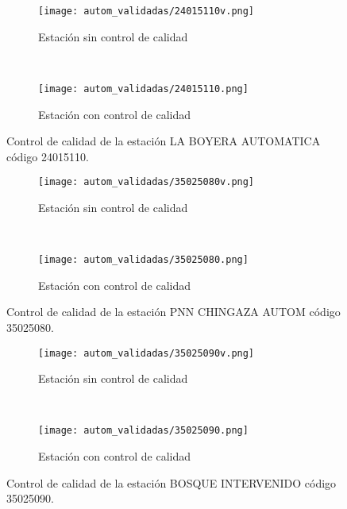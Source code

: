 \begin{figure}[H]
\begin{subfigure}[b]{0.5\textwidth}
\begin{center}
\texttt{[image: autom\_validadas/24015110v.png]}
\caption{Estación sin control de calidad}
        \end{center}
\end{subfigure}
~
\begin{subfigure}[b]{0.5\textwidth}
\begin{center}
\texttt{[image: autom\_validadas/24015110.png]}
\caption{Estación con control de calidad}
\end{center}    
\end{subfigure}
\caption{Control de calidad de la estación LA BOYERA AUTOMATICA código 24015110.}
\end{figure}    
  
\begin{figure}[H]
\begin{subfigure}[b]{0.5\textwidth}
\begin{center}
\texttt{[image: autom\_validadas/35025080v.png]}
\caption{Estación sin control de calidad}
        \end{center}
\end{subfigure}
~
\begin{subfigure}[b]{0.5\textwidth}
\begin{center}
\texttt{[image: autom\_validadas/35025080.png]}
\caption{Estación con control de calidad}
\end{center}    
\end{subfigure}
\caption{Control de calidad de la estación PNN CHINGAZA AUTOM código 35025080.}
\end{figure}    
  
\begin{figure}[H]
\begin{subfigure}[b]{0.5\textwidth}
\begin{center}
\texttt{[image: autom\_validadas/35025090v.png]}
\caption{Estación sin control de calidad}
        \end{center}
\end{subfigure}
~
\begin{subfigure}[b]{0.5\textwidth}
\begin{center}
\texttt{[image: autom\_validadas/35025090.png]}
\caption{Estación con control de calidad}
\end{center}    
\end{subfigure}
\caption{Control de calidad de la estación BOSQUE INTERVENIDO código 35025090.}
\end{figure}    
  

